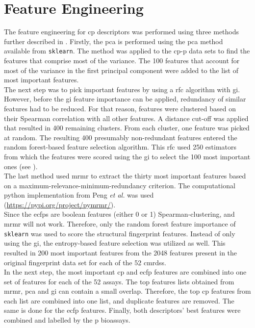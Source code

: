 \section{Feature Engineering}\label{sec:features}
The feature engineering for \ac{cp} descriptors was performed using three methods further described in . Firstly, the \ac{pca} is performed using the \ac{pca} method available from \texttt{sklearn}.\cite{Pedregosa2012} The method was applied to the \ac{cp}-\acl{p} data sets to find the features that comprise most of the variance. The \num{100} features that account for most of the variance in the first principal component were added to the list of most important features.\\
The next step was to pick important features by using a \ac{rfc} algorithm with \acl{gi}. However, before the \acl{gi} feature importance can be applied, redundancy of similar features had to be reduced. For that reason, features were clustered based on their Spearman correlation with all other features. A distance cut-off was applied that resulted in \num{400} remaining clusters. From each cluster, one feature was picked at random. The resulting \num{400} presumably non-redundant features entered the random forest-based feature selection algorithm. This \ac{rfc} used \num{250} estimators from which the features were scored using the \acl{gi} to select the \num{100} most important ones (see ).\cite{scikitfeature2021}\\
The last method used \ac{mrmr} to extract the thirty most important features based on a maximum-relevance-minimum-redundancy criterion. The computational python implementation from Peng \textit{et al.}\cite{Peng2005} was used (\url{https://pypi.org/project/pymrmr/}).\\
Since the \acp{ecfp} are boolean features (either \num{0} or \num{1}) Spearman-clustering, and \ac{mrmr} will not work. Therefore, only the random forest feature importance of \texttt{sklearn} was used to score the structural fingerprint features. Instead of only using the \acl{gi}, the entropy-based feature selection was utilized as well. This resulted in \num{200} most important features from the \num{2048} features present in the original fingerprint data set for each of the \num{52} \aclp{cmrds}.\cite{scikitfeature2021}\\
In the next step, the most important \ac{cp} and \ac{ecfp} features are combined into one set of features for each of the \num{52} assays. The top features lists obtained from \ac{mrmr}, \ac{pca} and \ac{gi} can contain a small overlap. Therefore, the top \ac{cp} features from each list are combined into one list, and duplicate features are removed. The same is done for the \ac{ecfp} features. Finally, both descriptors' best features were combined and labelled by the \acl{p} bioassays.
%
%
